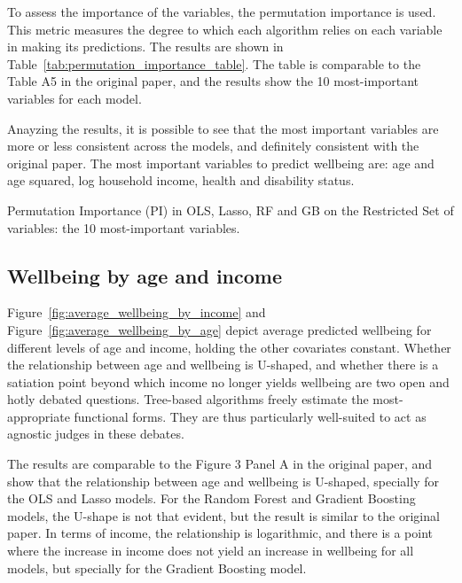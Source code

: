 \documentclass[11pt, a4paper, leqno]{article}
\begin{document}
To assess the importance of the variables, the permutation importance is used. This metric
measures the degree to which each algorithm relies on each variable in making its predictions.
The results are shown in Table~\ref{tab:permutation_importance_table}. The table is comparable
to the Table A5 in the original paper, and the results show the 10 most-important variables
for each model.

Anayzing the results, it is possible to see that the most important variables are more or less
consistent across the models, and definitely consistent with the original paper. The most
important variables to predict wellbeing are: age and age squared, log household income,
health and disability status.



\begin{table}[htbp]
    \centering
    
    \caption{Permutation Importance (PI) in OLS, Lasso, RF and GB on the Restricted Set of variables: the 10 most-important variables.}
    \label{tab:permutation_importance_table}
\end{table}


\subsection{Wellbeing by age and income}

Figure~\ref{fig:average_wellbeing_by_income} and Figure~\ref{fig:average_wellbeing_by_age} depict
average predicted wellbeing for different levels of age and income, holding the other covariates
constant. Whether the relationship between age and wellbeing is U-shaped, and whether there is a
satiation point beyond which income no longer yields wellbeing are two open and hotly debated questions.
Tree-based algorithms freely estimate the most-appropriate functional forms. They are thus
particularly well-suited to act as agnostic judges in these debates.

The results are comparable to the Figure 3 Panel A in the original paper, and show that the
relationship between age and wellbeing is U-shaped, specially for the OLS and Lasso models.
For the Random Forest and Gradient Boosting models, the U-shape is not that evident, but the result
is similar to the original paper. In terms of income, the relationship is logarithmic, and there
is a point where the increase in income does not yield an increase in wellbeing for all models,
but specially for the Gradient Boosting model.
\end{document}
